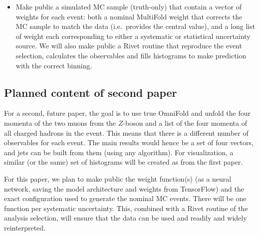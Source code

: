 \begin{itemize}
\item
  Make public a simulated MC sample (truth-only) that contain a vector of weights for each event: both a nominal MultiFold weight that corrects the MC sample to match the data (i.e.\ provides the central value), and a long list of weight each corresponding to either a systematic or statistical uncertainty source. We will also make public a Rivet routine that reproduce the event selection, calculates the observables and fills histograms to make prediction with the correct binning.
\end{itemize}

\subsection{Planned content of second paper}
For a second, future paper, the goal is to use true OmniFold and unfold the four momenta of the two muons from the $Z$-boson and a list of the four momenta of all charged hadrons in the event.
This means that there is a different number of observables for each event. The main results would hence be a set of four vectors, and jets can be built from them (using any algorithm).
For visualization, a similar (or the same) set of histograms will be created as from the first paper.

For this paper, we plan to make public the weight function(s) (as a neural network, saving the model architecture and weights from TensorFlow) and the exact configuration used to generate the nominal MC events.  There will be one function per systematic uncertainty.  This, combined with a Rivet routine of the analysis selection, will ensure that the data can be used and readily and widely reinterpreted.
